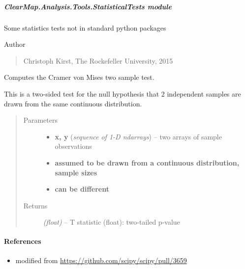 \documentclass[letterpaper,10pt,english]{sphinxmanual}
\begin{document}
\subparagraph{ClearMap.Analysis.Tools.StatisticalTests module}
\label{api/ClearMap.Analysis.Tools:module-ClearMap.Analysis.Tools.StatisticalTests}\label{api/ClearMap.Analysis.Tools:clearmap-analysis-tools-statisticaltests-module}
Some statistics tests not in standard python packages

Author
\begin{quote}

Christoph Kirst, The Rockefeller University, 2015
\end{quote}

\begin{fulllineitems}
\label{api/ClearMap.Analysis.Tools:ClearMap.Analysis.Tools.StatisticalTests.testCramerVonMises2Sample}
Computes the Cramer von Mises two sample test.

This is a two-sided test for the null hypothesis that 2 independent samples
are drawn from the same continuous distribution.
\begin{quote}\begin{description}
\item[{Parameters}] \leavevmode\begin{itemize}
\item {} 
\textbf{x, y} (\emph{sequence of 1-D ndarrays}) --
two arrays of sample observations

\item {} 
\textbf{assumed to be drawn from a continuous distribution, sample sizes}

\item {} 
\textbf{can be different}

\end{itemize}

\item[{Returns}] \leavevmode
\emph{(float)} --
T statistic
(float): two-tailed p-value

\end{description}\end{quote}
\paragraph{References}
\begin{itemize}
\item {} 
modified from \href{https://github.com/scipy/scipy/pull/3659}{https://github.com/scipy/scipy/pull/3659}

\end{itemize}

\end{fulllineitems}
\end{document}
